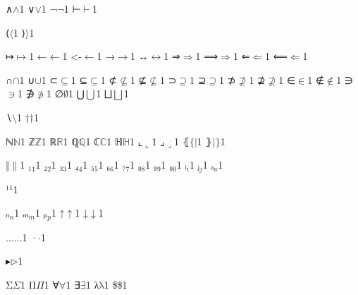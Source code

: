 {{∧}{{\ensuremath{\wedge}}}1
{∨}{{\ensuremath{\vee}}}1
{¬}{{\ensuremath{\neg}}}1
{⊢}{{\ensuremath{\vdash}}}1

{⟨}{{\ensuremath{\langle}}}1
{⟩}{{\ensuremath{\rangle}}}1

{↦}{{\ensuremath{\mapsto}}}1
{←}{{\ensuremath{\leftarrow}}}1
{<-}{{\ensuremath{\leftarrow}}}1
{→}{{\ensuremath{\rightarrow}}}1
{↔}{{\ensuremath{\leftrightarrow}}}1
{⇒}{{\ensuremath{\Rightarrow}}}1
{⟹}{{\ensuremath{\Longrightarrow}}}1
{⇐}{{\ensuremath{\Leftarrow}}}1
{⟸}{{\ensuremath{\Longleftarrow}}}1

{∩}{{\ensuremath{\cap}}}1
{∪}{{\ensuremath{\cup}}}1
{⊂}{{\ensuremath{\subseteq}}}1
{⊆}{{\ensuremath{\subseteq}}}1
{⊄}{{\ensuremath{\nsubseteq}}}1
{⊈}{{\ensuremath{\nsubseteq}}}1
{⊃}{{\ensuremath{\supseteq}}}1
{⊇}{{\ensuremath{\supseteq}}}1
{⊅}{{\ensuremath{\nsupseteq}}}1
{⊉}{{\ensuremath{\nsupseteq}}}1
{∈}{{\ensuremath{\in}}}1
{∉}{{\ensuremath{\notin}}}1
{∋}{{\ensuremath{\ni}}}1
{∌}{{\ensuremath{\notni}}}1
{∅}{{\ensuremath{\emptyset}}}1
{⋃}{{\ensuremath{\bigcup}}}1
{⨆}{{\ensuremath{\bigsqcup}}}1

{∖}{{\ensuremath{\setminus}}}1
{†}{{\ensuremath{\dag}}}1

{ℕ}{{\ensuremath{\mathbb{N}}}}1
{ℤ}{{\ensuremath{\mathbb{Z}}}}1
{ℝ}{{\ensuremath{\mathbb{R}}}}1
{ℚ}{{\ensuremath{\mathbb{Q}}}}1
{ℂ}{{\ensuremath{\mathbb{C}}}}1
{ℍ}{{\ensuremath{\mathbb{H}}}}1
{⌞}{{\ensuremath{\llcorner}}}1
{⌟}{{\ensuremath{\lrcorner}}}1
{⦃}{{\ensuremath{\{\!|}}}1
{⦄}{{\ensuremath{|\!\}}}}1

{‖}{{\ensuremath{\|}}}1
{₁}{{\ensuremath{_1}}}1
{₂}{{\ensuremath{_2}}}1
{₃}{{\ensuremath{_3}}}1
{₄}{{\ensuremath{_4}}}1
{₅}{{\ensuremath{_5}}}1
{₆}{{\ensuremath{_6}}}1
{₇}{{\ensuremath{_7}}}1
{₈}{{\ensuremath{_8}}}1
{₉}{{\ensuremath{_9}}}1
{₀}{{\ensuremath{_0}}}1
{ᵢ}{{\ensuremath{_i}}}1
{ⱼ}{{\ensuremath{_j}}}1
{ₐ}{{\ensuremath{_a}}}1

{¹}{{\ensuremath{^1}}}1

{ₙ}{{\ensuremath{_n}}}1
{ₘ}{{\ensuremath{_m}}}1
{ₚ}{{\ensuremath{_p}}}1
{↑}{{\ensuremath{\uparrow}}}1
{↓}{{\ensuremath{\downarrow}}}1

{...}{{\ensuremath{\ldots}}}1
{·}{{\ensuremath{\cdot}}}1

{▸}{{\ensuremath{\triangleright}}}1

{Σ}{{\color{symbolcolor}\ensuremath{\Sigma}}}1
{Π}{{\color{symbolcolor}\ensuremath{\Pi}}}1
{∀}{{\color{symbolcolor}\ensuremath{\forall}}}1
{∃}{{\color{symbolcolor}\ensuremath{\exists}}}1
{λ}{{\color{symbolcolor}\ensuremath{\mathrm{\lambda}}}}1
{\$}{{\color{symbolcolor}\$}}1

}

